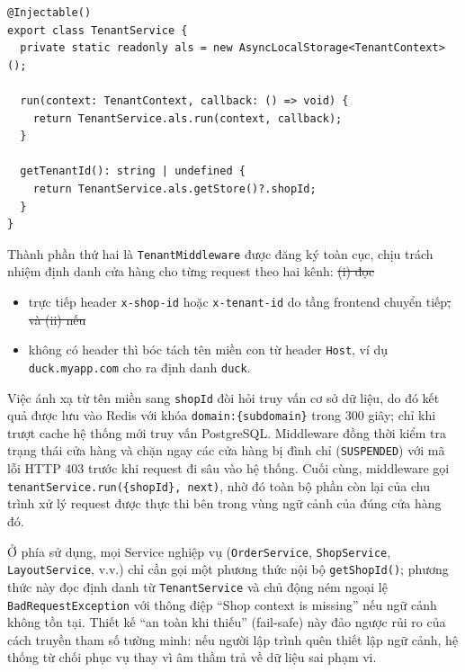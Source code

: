 \documentclass[../main.tex]{subfiles}
\providecommand{\DIFadd}[1]{{\protect\color{blue}\uwave{#1}}} %
\providecommand{\DIFdel}[1]{{\protect\color{red}\sout{#1}}} %
\providecommand{\DIFaddbegin}{} %
\providecommand{\DIFaddend}{} %
\providecommand{\DIFdelbegin}{} %
\providecommand{\DIFdelend}{} %
\begin{document}
\begin{lstlisting}[caption={Lớp TenantService bao bọc AsyncLocalStorage}, label={lst:tenant_service}]
@Injectable()
export class TenantService {
  private static readonly als = new AsyncLocalStorage<TenantContext>();

  run(context: TenantContext, callback: () => void) {
    return TenantService.als.run(context, callback);
  }

  getTenantId(): string | undefined {
    return TenantService.als.getStore()?.shopId;
  }
}
\end{lstlisting}

Thành phần thứ hai là \texttt{TenantMiddleware} được đăng ký toàn cục, chịu trách nhiệm định danh cửa hàng cho từng request theo hai kênh:
\DIFdelbegin \DIFdel{(i) đọc }\DIFdelend \DIFaddbegin 

\begin{itemize}
    \item \DIFadd{Đọc }\DIFaddend trực tiếp header \texttt{x-shop-id} hoặc \texttt{x-tenant-id} do tầng frontend chuyển tiếp\DIFdelbegin \DIFdel{, và (ii) nếu }\DIFdelend \DIFaddbegin \DIFadd{.
    }\item \DIFadd{Nếu }\DIFaddend không có header thì bóc tách tên miền con từ header \texttt{Host}, ví dụ \texttt{duck.myapp.com} cho ra định danh \texttt{duck}.
\DIFaddbegin \end{itemize}

\DIFaddend Việc ánh xạ từ tên miền sang \texttt{shopId} đòi hỏi truy vấn cơ sở dữ liệu, do đó kết quả được lưu vào Redis với khóa \texttt{domain:\{subdomain\}} trong 300 giây; chỉ khi trượt cache hệ thống mới truy vấn PostgreSQL. Middleware đồng thời kiểm tra trạng thái cửa hàng và chặn ngay các cửa hàng bị đình chỉ (\texttt{SUSPENDED}) với mã lỗi HTTP 403 trước khi request đi sâu vào hệ thống. Cuối cùng, middleware gọi \texttt{tenantService.run(\{shopId\}, next)}, nhờ đó toàn bộ phần còn lại của chu trình xử lý request được thực thi bên trong vùng ngữ cảnh của đúng cửa hàng đó.

Ở phía sử dụng, mọi Service nghiệp vụ (\texttt{OrderService}, \texttt{ShopService}, \texttt{LayoutService}, v.v.) chỉ cần gọi một phương thức nội bộ \texttt{getShopId()}; phương thức này đọc định danh từ \texttt{TenantService} và chủ động ném ngoại lệ \texttt{BadRequestException} với thông điệp ``Shop context is missing'' nếu ngữ cảnh không tồn tại. Thiết kế ``an toàn khi thiếu'' (fail-safe) này đảo ngược rủi ro của cách truyền tham số tường minh: nếu người lập trình quên thiết lập ngữ cảnh, hệ thống từ chối phục vụ thay vì âm thầm trả về dữ liệu sai phạm vi.
\end{document}
